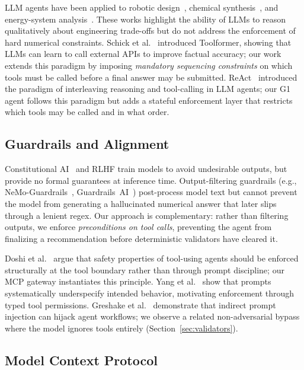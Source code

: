 \documentclass[conference]{IEEEtran}
\begin{document}
LLM agents have been applied to robotic design~\cite{makatura2023llm},
chemical synthesis~\cite{boiko2023emergent}, and energy-system
analysis~\cite{zheng2024energy}.  These works highlight the ability of
LLMs to reason qualitatively about engineering trade-offs but do not
address the enforcement of hard numerical constraints.  Schick et
al.~\cite{schick2023toolformer} introduced Toolformer, showing that LLMs
can learn to call external APIs to improve factual accuracy; our work
extends this paradigm by imposing \emph{mandatory sequencing constraints}
on which tools must be called before a final answer may be submitted.
ReAct~\cite{yao2023react} introduced the paradigm of interleaving reasoning
and tool-calling in LLM agents; our G1 agent follows this paradigm but adds
a stateful enforcement layer that restricts which tools may be called and
in what order.

\subsection{Guardrails and Alignment}

Constitutional AI~\cite{bai2022constitutional} and RLHF train models to
avoid undesirable outputs, but provide no formal guarantees at inference
time.  Output-filtering guardrails (e.g., NeMo-Guardrails~\cite{rebedea2023nemo},
Guardrails~AI~\cite{guardrailsai}) post-process model text but cannot
prevent the model from generating a hallucinated numerical answer that
later slips through a lenient regex.  Our approach is complementary:
rather than filtering outputs, we enforce \emph{preconditions on tool calls},
preventing the agent from finalizing a recommendation before deterministic
validators have cleared it.

Doshi et al.~\cite{doshi2026} argue that safety properties of
tool-using agents should be enforced structurally at the tool boundary
rather than through prompt discipline; our MCP gateway instantiates
this principle.  Yang et al.~\cite{yang2025} show that prompts
systematically underspecify intended behavior, motivating enforcement
through typed tool permissions.  Greshake et al.~\cite{greshake2023indirect}
demonstrate that indirect prompt injection can hijack agent workflows;
we observe a related non-adversarial bypass where the model ignores
tools entirely (Section~\ref{sec:validators}).

\subsection{Model Context Protocol}
\end{document}
